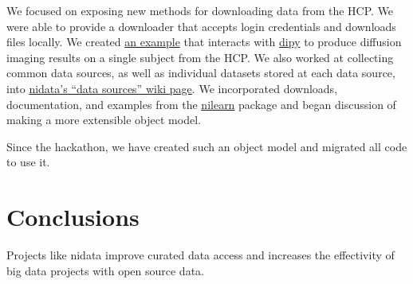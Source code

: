 \documentclass[twocolumn]{bmcart}%
\begin{document}
We focused on exposing new methods for downloading data from the HCP. We
were able to provide a downloader that accepts login credentials and
downloads files locally. We created
\href{https://github.com/arokem/nidata/blob/bcipolli-ohbm2015-ipynb/ipynb/hcp-fetcher-dwi.ipynb}{an
example} that interacts with \href{https://github.com/nipy/dipy}{dipy}
to produce diffusion imaging results on a single subject from the HCP.
We also worked at collecting common data sources, as well as individual
datasets stored at each data source, into
\href{https://github.com/nidata/nidata/wiki/Data-sources}{nidata's
``data sources'' wiki page}. We incorporated downloads, documentation,
and examples from the \href{http://github.com/nilearn/nilearn}{nilearn}
package and began discussion of making a more extensible object model.

Since the hackathon, we have created such an object model and migrated
all code to use it.

\section{Conclusions}\label{conclusions}

Projects like nidata improve curated data access and increases the
effectivity of big data projects with open source data.

\end{document}
